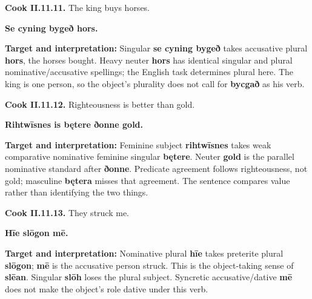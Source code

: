\par\begin{minipage}{\linewidth}\raggedright
\textbf{Cook II.11.11.} The king buys horses.

\textbf{Se cyning bygeð hors.}

\textbf{Target and interpretation:} Singular \textbf{se cyning bygeð} takes accusative plural \textbf{hors}, the horses bought. Heavy neuter \textbf{hors} has identical singular and plural nominative/\allowbreak{}accusative spellings; the English task determines plural here. The king is one person, so the object's plurality does not call for \textbf{bycgað} as his verb.

\end{minipage}\par\addvspace{4pt}

\par\begin{minipage}{\linewidth}\raggedright
\textbf{Cook II.11.12.} Righteousness is better than gold.

\textbf{Rihtwīsnes is bętere ðonne gold.}

\textbf{Target and interpretation:} Feminine subject \textbf{rihtwīsnes} takes weak comparative nominative feminine singular \textbf{bętere}. Neuter \textbf{gold} is the parallel nominative standard after \textbf{ðonne}. Predicate agreement follows righteousness, not gold; masculine \textbf{bętera} misses that agreement. The sentence compares value rather than identifying the two things.

\end{minipage}\par\addvspace{4pt}

\par\begin{minipage}{\linewidth}\raggedright
\textbf{Cook II.11.13.} They struck me.

\textbf{Hīe slōgon mē.}

\textbf{Target and interpretation:} Nominative plural \textbf{hīe} takes preterite plural \textbf{slōgon}; \textbf{mē} is the accusative person struck. This is the object-taking sense of \textbf{slēan}. Singular \textbf{slōh} loses the plural subject. Syncretic accusative/\allowbreak{}dative \textbf{mē} does not make the object's role dative under this verb.

\end{minipage}\par\addvspace{4pt}

